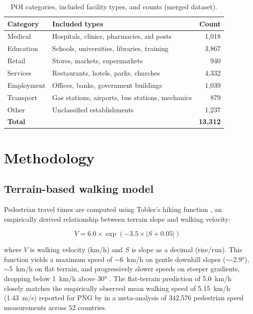 \documentclass[review,3p,authoryear]{elsarticle}
\begin{document}
\begin{table}[!h]
\centering
\caption{POI categories, included facility types, and counts (merged dataset).}
\label{tab:poicats}
\begin{tabular}{@{}llr@{}}
\toprule
Category & Included types & Count \\
\midrule
Medical    & Hospitals, clinics, pharmacies, aid posts        & 1,018 \\
Education  & Schools, universities, libraries, training       & 3,867 \\
Retail     & Stores, markets, supermarkets                    & 940   \\
Services   & Restaurants, hotels, parks, churches             & 4,332 \\
Employment & Offices, banks, government buildings             & 1,039 \\
Transport  & Gas stations, airports, bus stations, mechanics  & 879   \\
Other      & Unclassified establishments                      & 1,237 \\
\midrule
\textbf{Total} & & \textbf{13,312} \\
\bottomrule
\end{tabular}
\end{table}

\section{Methodology}
\label{sec:methodology}

\subsection{Terrain-based walking model}

Pedestrian travel times are computed using Tobler's hiking function \citep{tobler1993}, an empirically derived relationship between terrain slope and walking velocity:

\begin{equation}
V = 6.0 \times \exp\left(-3.5 \times |S + 0.05|\right)
\label{eq:tobler}
\end{equation}

\noindent where $V$ is walking velocity (\si{\kilo\metre/\hour}) and $S$ is slope as a decimal (rise/run). This function yields a maximum speed of $\sim$\SI{6}{\kilo\metre/\hour} on gentle downhill slopes ($\sim$\ang{-2.9}), $\sim$\SI{5}{\kilo\metre/\hour} on flat terrain, and progressively slower speeds on steeper gradients, dropping below \SI{1}{\kilo\metre/\hour} above \ang{30} \citep{goodchild2020, irmischer2018}. The flat-terrain prediction of \SI{5.0}{\kilo\metre/\hour} closely matches the empirically observed mean walking speed of \SI{5.15}{\kilo\metre/\hour} (\SI{1.43}{\metre/\second}) reported for PNG by \citet{bosina2017} in a meta-analysis of 342,576 pedestrian speed measurements across 52 countries.
\end{document}
